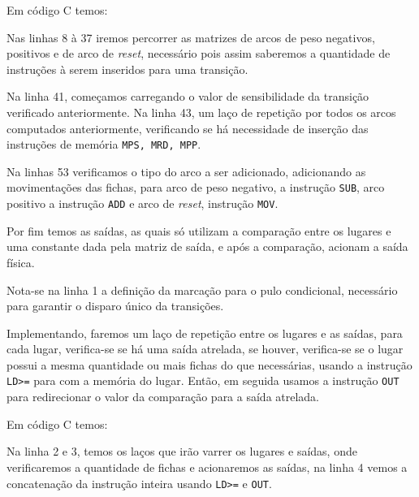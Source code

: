 

Em código C temos:



Nas linhas 8 à 37 iremos percorrer as matrizes de arcos de peso negativos, positivos e de arco de \textit{reset}, necessário pois assim saberemos a quantidade de instruções à serem inseridos para uma transição.  

Na linha 41, começamos carregando o valor de sensibilidade da transição verificado anteriormente. Na linha 43, um laço de repetição por todos os arcos computados anteriormente, verificando se há necessidade de inserção das instruções de memória \lstinline{MPS, MRD, MPP}.

Na linhas 53 verificamos o tipo do arco a ser adicionado, adicionando as movimentações das fichas, para arco de peso negativo, a instrução \lstinline{SUB}, arco positivo a instrução \lstinline{ADD} e arco de \textit{reset}, instrução \lstinline{MOV}. 

Por fim temos as saídas, as quais só utilizam a comparação entre os lugares e uma constante dada pela matriz de saída, e após a comparação, acionam a saída física.



Nota-se na linha 1 a definição da marcação para o pulo condicional, necessário para garantir o disparo único da transições. 

Implementando, faremos um laço de repetição entre os lugares e as saídas, para cada lugar, verifica-se se há uma saída atrelada, se houver, verifica-se se o lugar possui a mesma quantidade ou mais fichas do que necessárias, usando a instrução \lstinline{LD>=} para com a memória do lugar. Então, em seguida usamos a instrução \lstinline{OUT} para redirecionar o valor da comparação para a saída atrelada. 

Em código C temos:



Na linha 2 e 3, temos os laços que irão varrer os lugares e saídas, onde verificaremos a quantidade de fichas e acionaremos as saídas, na linha 4 vemos a concatenação da instrução inteira usando \lstinline{LD>=} e \lstinline{OUT}. 